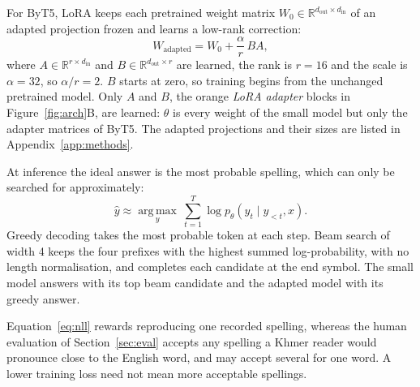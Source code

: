 \documentclass[10pt,a4paper,twocolumn]{article}
\begin{document}
For ByT5, LoRA \citep{hu-etal-2022-lora} keeps each pretrained weight matrix $W_0\in\mathbb{R}^{d_{\text{out}}\times
d_{\text{in}}}$ of an adapted projection frozen and learns a low-rank correction:
\begin{equation}
  W_{\text{adapted}} = W_0 + \frac{\alpha}{r}\,BA,
  \label{eq:lora}
\end{equation}
where $A\in\mathbb{R}^{r\times d_{\text{in}}}$ and $B\in\mathbb{R}^{d_{\text{out}}\times r}$ are learned,
the rank is $r=16$ and the scale is $\alpha=32$, so $\alpha/r=2$. $B$ starts at zero, so training begins from the unchanged
pretrained model. Only $A$ and $B$, the orange \emph{LoRA adapter} blocks in Figure~\ref{fig:arch}B, are learned:
$\theta$ is every weight of the small model but only the adapter matrices of ByT5. The adapted projections and
their sizes are listed in Appendix~\ref{app:methods}.

At inference the ideal answer is the most probable spelling, which can only be searched for approximately:
\begin{equation}
  \hat{y}\approx\operatorname*{arg\,max}_{y}\ \sum_{t=1}^{T}\log p_\theta(y_t\mid y_{<t},x).
  \label{eq:decode}
\end{equation}
Greedy decoding takes the most probable token at each step. Beam search of width 4 keeps the four prefixes with the
highest summed log-probability, with no length normalisation, and completes each candidate at the end symbol. The
small model answers with its top beam candidate and the adapted model with its greedy answer.

Equation~\eqref{eq:nll} rewards reproducing one recorded spelling, whereas the human evaluation of
Section~\ref{sec:eval} accepts any spelling a Khmer reader would pronounce close to the English word, and may
accept several for one word. A lower training loss need not mean more acceptable spellings.
\end{document}
